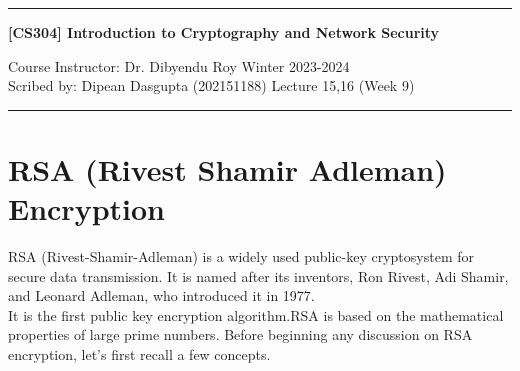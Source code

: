 \documentclass[11pt]{article}
\begin{document}
\setcounter{section}{0}
\noindent
\rule{\textwidth}{1pt}
\begin{center}
{\bf [CS304] Introduction to Cryptography and Network Security}
\end{center}
Course Instructor: Dr. Dibyendu Roy \hfill Winter 2023-2024\\
Scribed by: Dipean Dasgupta (202151188) \hfill Lecture 15,16 (Week 9)
\\
\rule{\textwidth}{1pt}
\section{RSA (Rivest Shamir Adleman) Encryption}
RSA (Rivest-Shamir-Adleman) is a widely used public-key cryptosystem for secure data transmission. It is named after its inventors, Ron Rivest, Adi Shamir, and Leonard Adleman, who introduced it in 1977. \\
It is the first public key encryption algorithm.RSA is based on the mathematical properties of large prime numbers. Before beginning any discussion on RSA encryption, let's first recall a few concepts.
\end{document}
